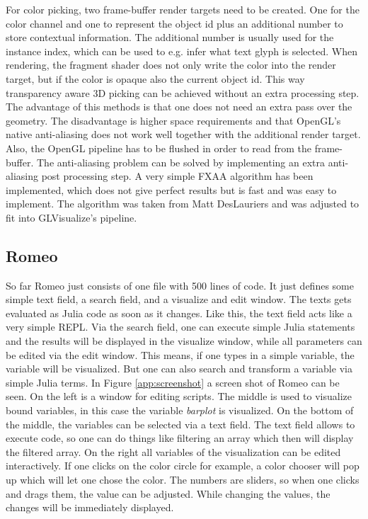 For color picking, two frame-buffer render targets need to be created. 
One for the color channel and one to represent the object id plus an additional number to store contextual information. The additional number is usually used for the instance index, which can be used to e.g. infer what text glyph is selected.
When rendering, the fragment shader does not only write the color into the render target, but if the color is opaque also the current object id.
This way transparency aware 3D picking can be achieved without an extra processing step. 
The advantage of this methods is that one does not need an extra pass over the geometry. The disadvantage is higher space requirements and that OpenGL's native anti-aliasing does not work well together with the additional render target. Also, the OpenGL pipeline has to be flushed in order to read from the frame-buffer.
The anti-aliasing problem can be solved by implementing an extra anti-aliasing post processing step. A very simple FXAA algorithm has been implemented, which does not give perfect results but is fast and was easy to implement. The algorithm was taken from Matt DesLauriers\cite{FXAA} and was adjusted to fit into GLVisualize's pipeline.


\subsection{Romeo}

So far Romeo just consists of one file with 500 lines of code. 
It just defines some simple text field, a search field, and a visualize and edit window.
The texts gets evaluated as Julia code as soon as it changes. Like this, the text field acts like a very simple \ac{REPL}.
Via the search field, one can execute simple Julia statements and the results will be displayed in the visualize window, while all parameters can be edited via the edit window.
This means, if one types in a simple variable, the variable will be visualized. But one can also search and transform a variable via simple Julia terms.
In Figure \ref{app:screenshot} a screen shot of Romeo can be seen.
On the left is a window for editing scripts. The middle is used to visualize bound variables, in this case the variable \textit{barplot} is visualized.
On the bottom of the middle, the variables can be selected via a text field. The text field allows to execute code, so one can do things like filtering an array which then will display the filtered array.
On the right all variables of the visualization can be edited interactively.
If one clicks on the color circle for example, a color chooser will pop up which will let one chose the color.
The numbers are sliders, so when one clicks and drags them, the value can be adjusted. 
While changing the values, the changes will be immediately displayed.

